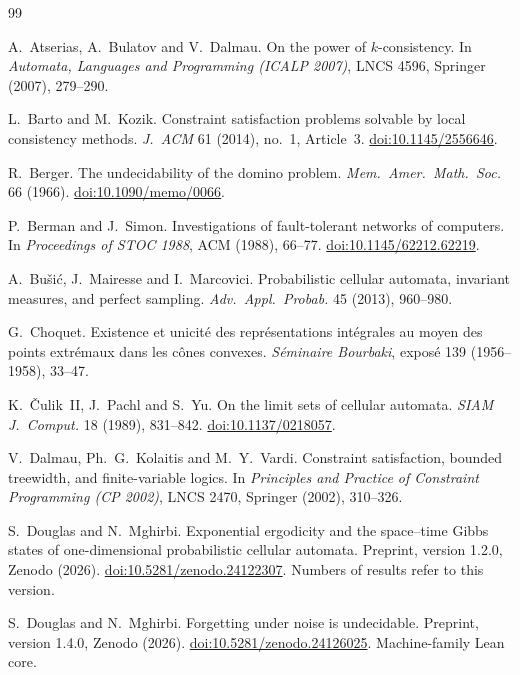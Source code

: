 \begin{thebibliography}{99}

 A.~Atserias, A.~Bulatov and V.~Dalmau. On the power of $k$-consistency. In \emph{Automata, Languages and Programming (ICALP 2007)}, LNCS 4596, Springer (2007), 279--290.

 L.~Barto and M.~Kozik. Constraint satisfaction problems solvable by local consistency methods. \emph{J.\ ACM} 61 (2014), no.~1, Article~3. \href{https://doi.org/10.1145/2556646}{doi:10.1145/2556646}.

 R.~Berger. The undecidability of the domino problem. \emph{Mem.\ Amer.\ Math.\ Soc.} 66 (1966). \href{https://doi.org/10.1090/memo/0066}{doi:10.1090/memo/0066}.

 P.~Berman and J.~Simon. Investigations of fault-tolerant networks of computers. In \emph{Proceedings of STOC 1988}, ACM (1988), 66--77. \href{https://doi.org/10.1145/62212.62219}{doi:10.1145/62212.62219}.

 A.~Bu\v{s}i\'c, J.~Mairesse and I.~Marcovici. Probabilistic cellular automata, invariant measures, and perfect sampling. \emph{Adv.\ Appl.\ Probab.} 45 (2013), 960--980.

 G.~Choquet. Existence et unicit\'e des repr\'esentations int\'egrales au moyen des points extr\'emaux dans les c\^ones convexes. \emph{S\'eminaire Bourbaki}, expos\'e 139 (1956--1958), 33--47.

 K.~\v{C}ulik~II, J.~Pachl and S.~Yu. On the limit sets of cellular automata. \emph{SIAM J.\ Comput.} 18 (1989), 831--842. \href{https://doi.org/10.1137/0218057}{doi:10.1137/0218057}.

 V.~Dalmau, Ph.~G.~Kolaitis and M.~Y.~Vardi. Constraint satisfaction, bounded treewidth, and finite-variable logics. In \emph{Principles and Practice of Constraint Programming (CP 2002)}, LNCS 2470, Springer (2002), 310--326.

 S.~Douglas and N.~Mghirbi. Exponential ergodicity and the space--time Gibbs states of one-dimensional probabilistic cellular automata. Preprint, version 1.2.0, Zenodo (2026). \href{https://doi.org/10.5281/zenodo.24122307}{doi:10.5281/zenodo.24122307}. Numbers of results refer to this version.

 S.~Douglas and N.~Mghirbi. Forgetting under noise is undecidable. Preprint, version 1.4.0, Zenodo (2026). \href{https://doi.org/10.5281/zenodo.24126025}{doi:10.5281/zenodo.24126025}. Machine-family Lean core.


\end{thebibliography}
